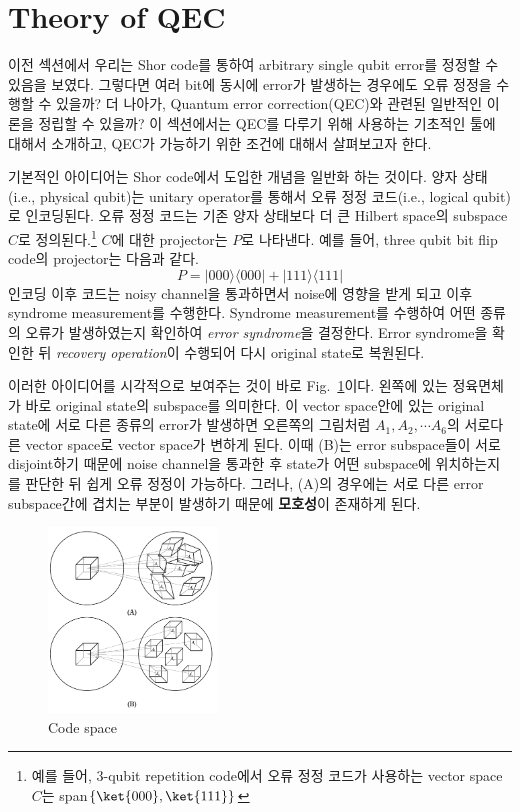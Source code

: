 \section{Theory of QEC}
이전 섹션에서 우리는 Shor code를 통하여 arbitrary single qubit error를 정정할 수 있음을 보였다. 그렇다면 여러 bit에 동시에 error가 발생하는 경우에도 오류 정정을 수행할 수 있을까? 더 나아가, Quantum error correction(QEC)와 관련된 일반적인 이론을 정립할 수 있을까?
이 섹션에서는 QEC를 다루기 위해 사용하는 기초적인 툴에 대해서 소개하고, QEC가 가능하기 위한 조건에 대해서 살펴보고자 한다.

\vspace{1em}
기본적인 아이디어는 Shor code에서 도입한 개념을 일반화 하는 것이다. 양자 상태(i.e., physical qubit)는 unitary operator를 통해서 오류 정정 코드(i.e., logical qubit)로 인코딩된다. 오류 정정 코드는 기존 양자 상태보다 더 큰 Hilbert space의 subspace $C$로 정의된다.\footnote{예를 들어, 3-qubit repetition code에서 오류 정정 코드가 사용하는 vector space $C$는 span$\{\ket{000}, \ket{111}\}$} $C$에 대한 projector는 $P$로 나타낸다. 예를 들어, three qubit  bit flip code의 projector는 다음과 같다.
\begin{equation*}
    P=|000\rangle\langle 000|+|111\rangle\langle 111| 
\end{equation*}
인코딩 이후 코드는 noisy channel을 통과하면서 noise에 영향을 받게 되고 이후 syndrome measurement를 수행한다. Syndrome measurement를 수행하여 어떤 종류의 오류가 발생하였는지 확인하여 \textit{error syndrome}을 결정한다. Error syndrome을 확인한 뒤 \textit{recovery operation}이 수행되어 다시 original state로 복원된다.

이러한 아이디어를 시각적으로 보여주는 것이 바로 Fig.~\ref{fig:code-space}이다. 왼쪽에 있는 정육면체가 바로 original state의 subspace를 의미한다. 이 vector space안에 있는 original state에 서로 다른 종류의 error가 발생하면 오른쪽의 그림처럼 $A_1, A_2, \cdots A_6$의 서로다른 vector space로 vector space가 변하게 된다.
이때 (B)는 error subspace들이 서로 disjoint하기 때문에 noise channel을 통과한 후 state가 어떤 subspace에 위치하는지를 판단한 뒤 쉽게 오류 정정이 가능하다. 그러나, (A)의 경우에는 서로 다른 error subspace간에 겹치는 부분이 발생하기 때문에 \textbf{모호성}이 존재하게 된다.

\begin{figure}
    \centering
    \includegraphics[width=0.4\textwidth]{figures/code_space.png}
    \caption{Code space} \label{fig:code-space}
\end{figure}

